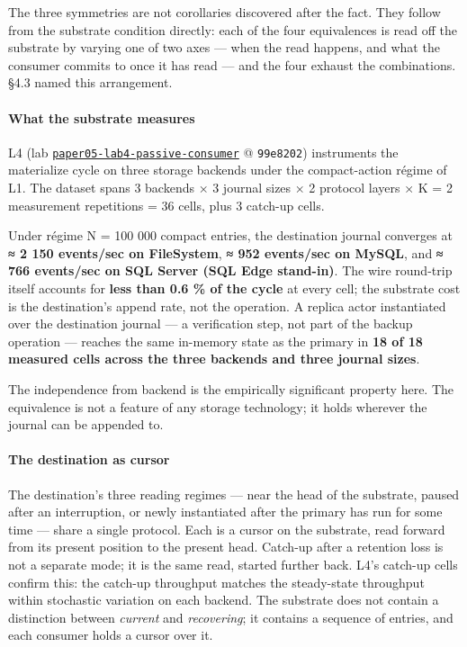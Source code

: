 \documentclass[
]{article}
\begin{document}
The three symmetries are not corollaries discovered after the fact. They
follow from the substrate condition directly: each of the four
equivalences is read off the substrate by varying one of two axes ---
when the read happens, and what the consumer commits to once it has read
--- and the four exhaust the combinations. §4.3 named this arrangement.

\paragraph{What the substrate
measures}\label{what-the-substrate-measures-1}

L4 (lab
\href{data/paper05-lab4-passive-consumer/}{\texttt{paper05-lab4-passive-consumer}}
@ \texttt{99e8202}) instruments the materialize cycle on three storage
backends under the compact-action régime of L1. The dataset spans 3
backends × 3 journal sizes × 2 protocol layers × K = 2 measurement
repetitions = 36 cells, plus 3 catch-up cells.

Under régime N = 100 000 compact entries, the destination journal
converges at \textbf{≈ 2 150 events/sec on FileSystem}, \textbf{≈ 952
events/sec on MySQL}, and \textbf{≈ 766 events/sec on SQL Server (SQL
Edge stand-in)}. The wire round-trip itself accounts for \textbf{less
than 0.6 \% of the cycle} at every cell; the substrate cost is the
destination's append rate, not the operation. A replica actor
instantiated over the destination journal --- a verification step, not
part of the backup operation --- reaches the same in-memory state as the
primary in \textbf{18 of 18 measured cells across the three backends and
three journal sizes}.

The independence from backend is the empirically significant property
here. The equivalence is not a feature of any storage technology; it
holds wherever the journal can be appended to.

\paragraph{The destination as cursor}\label{the-destination-as-cursor}

The destination's three reading regimes --- near the head of the
substrate, paused after an interruption, or newly instantiated after the
primary has run for some time --- share a single protocol. Each is a
cursor on the substrate, read forward from its present position to the
present head. Catch-up after a retention loss is not a separate mode; it
is the same read, started further back. L4's catch-up cells confirm
this: the catch-up throughput matches the steady-state throughput within
stochastic variation on each backend. The substrate does not contain a
distinction between \emph{current} and \emph{recovering}; it contains a
sequence of entries, and each consumer holds a cursor over it.
\end{document}
